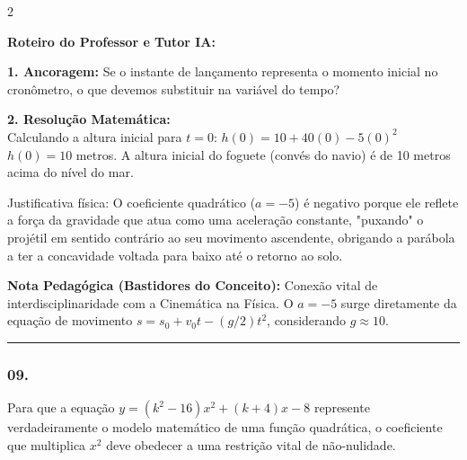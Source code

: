 \begin{multicols*}{2}
\ifgabarito
    \begin{tcolorbox}[colback=CorTitUm!5, colframe=CorTitUm, boxrule=1pt, arc=4pt, left=6pt, right=6pt, top=6pt, bottom=6pt]
    \small\textbf{\textcolor{CorTitUm}{Roteiro do Professor e Tutor IA:}}\par\vspace{0.1cm}
    \color{CinzaEscuro}
    \textbf{1. Ancoragem:} Se o instante de lançamento representa o momento inicial no cronômetro, o que devemos substituir na variável do tempo?\par\vspace{0.1cm}
    \textbf{2. Resolução Matemática:}\\
    Calculando a altura inicial para $t = 0$:
    $h(0) = 10 + 40(0) - 5(0)^2$
    $h(0) = 10$ metros.
    A altura inicial do foguete (convés do navio) é de 10 metros acima do nível do mar.
    
    Justificativa física: O coeficiente quadrático ($a = -5$) é negativo porque ele reflete a força da gravidade que atua como uma aceleração constante, "puxando" o projétil em sentido contrário ao seu movimento ascendente, obrigando a parábola a ter a concavidade voltada para baixo até o retorno ao solo.
    \end{tcolorbox}
    \vspace{0.15cm}
    
    \begin{boxexplicacao}
    \textbf{Nota Pedagógica (Bastidores do Conceito):} Conexão vital de interdisciplinaridade com a Cinemática na Física. O $a = -5$ surge diretamente da equação de movimento $s = s_0 + v_0 t - (g/2) t^2$, considerando $g \approx 10$.
    \end{boxexplicacao}
\fi

\par\vspace{\espacoQuestao}

\noindent\textcolor{CorLinha}{\rule{\linewidth}{0.5pt}} 
\par\vspace{\espacoPreQuestao}
\subsubsection*{09.} 
\begin{enunciadoLiteral}
Para que a equação $y = (k^2 - 16)x^2 + (k + 4)x - 8$ represente verdadeiramente o modelo matemático de uma função quadrática, o coeficiente que multiplica $x^2$ deve obedecer a uma restrição vital de não-nulidade. 


\end{enunciadoLiteral}
\end{multicols*}
